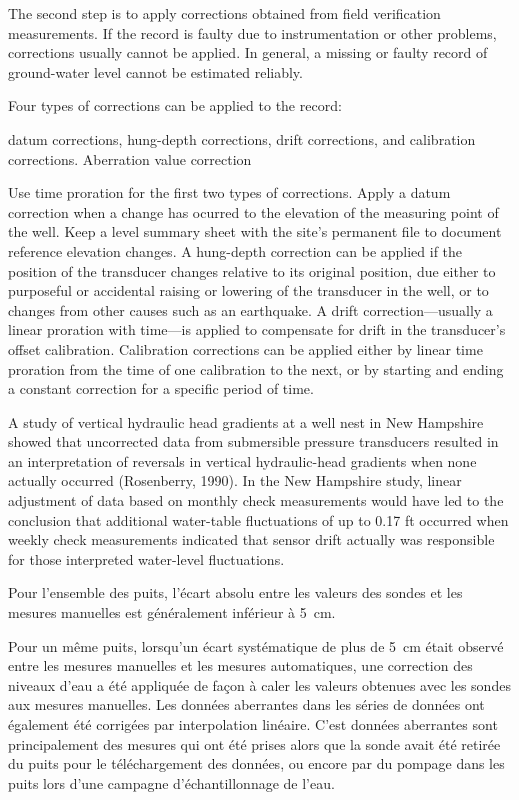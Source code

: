 \documentclass[WHATMANUAL.tex]{subfiles}
\begin{document}
The second step is to apply corrections obtained from field verification measurements. If the record is faulty due to instrumentation or other problems, corrections usually cannot be applied. In general, a missing or faulty record of ground-water level cannot be estimated reliably.

Four types of corrections can be applied to the record:

datum corrections,
hung-depth corrections,
drift corrections, and calibration corrections. 
Aberration value correction

Use time proration for the first two types of corrections. Apply a datum correction when a change has ocurred to the elevation of the measuring point of the well. Keep a level summary sheet with the site’s permanent file to document reference elevation changes. A hung-depth correction can be applied if the position of the transducer changes relative to its original position, due either to purposeful or accidental raising or lowering of the transducer in the well, or to changes from other causes such as an earthquake. A drift correction—usually a linear proration with time—is applied to compensate for drift in the transducer’s offset calibration. Calibration corrections can be applied either by linear time proration from the time of one calibration to the next, or by starting and ending a constant correction for a specific period of time.

A study of vertical hydraulic head gradients at a well nest in New Hampshire showed that uncorrected data from submersible pressure transducers resulted in an interpretation of reversals in vertical hydraulic-head gradients when none actually occurred (Rosenberry, 1990). In the New Hampshire study, linear adjustment of data based on monthly check measurements would have led to the conclusion that additional water-table fluctuations of up to 0.17 ft occurred when weekly check measurements indicated that sensor drift actually was responsible for those interpreted water-level fluctuations.

Pour l’ensemble des puits, l’écart absolu entre les valeurs des sondes et les mesures manuelles est généralement inférieur à 5 cm.

Pour un même puits, lorsqu'un écart systématique de plus de 5 cm était observé entre les mesures manuelles et les mesures automatiques, une correction des niveaux d’eau a été  appliquée de façon à caler les valeurs obtenues avec les sondes aux mesures manuelles.
Les données aberrantes dans les séries de données ont également été corrigées par interpolation linéaire. C’est données aberrantes sont principalement des mesures qui ont été prises alors que la sonde avait été retirée du puits pour le téléchargement des données, ou encore par du pompage dans les puits lors d’une campagne d’échantillonnage de l’eau.
\end{document}
